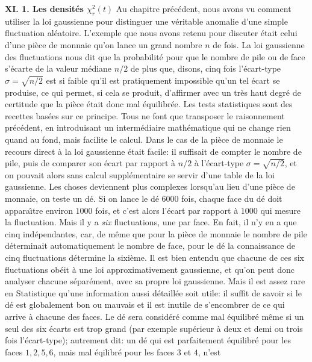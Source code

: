 {\bf XI. 1. Les densit\'es $\chi_r^2(t)$}  
\medskip
Au chapitre pr\'ec\'edent, nous avons vu comment utiliser la loi 
gaussienne pour distinguer une v\'eritable anomalie d'une simple
fluctuation al\'eatoire. L'exemple que nous avons retenu pour discuter
\'etait celui d'une pi\`ece de monnaie qu'on lance un grand nombre $n$ de
fois. La loi gaussienne des fluctuations nous dit que la probabilit\'e pour
que le nombre de pile ou de face s'\'ecarte de la valeur m\'ediane $n/2$ 
de plus que, disons, cinq fois l'\'ecart-type $\sigma = \sqrt{n/2}$ 
est si faible qu'il est pratiquement impossible qu'un tel \'ecart se
produise, ce qui permet, si cela se produit, d'affirmer avec un tr\`es 
haut degr\'e de certitude que la pi\`ece \'etait donc mal \'equilibr\'ee. 
\medskip
Les tests statistiques sont des recettes bas\'ees sur ce principe. Tous ne
font que transposer le raisonnement pr\'ec\'edent, en introduisant un
interm\'ediaire math\'ematique qui ne change rien quand au fond, mais
facilite le calcul. Dans le cas de la pi\`ece de monnaie le recours direct 
\`a la loi gaussienne \'etait facile: il suffisait de compter le nombre de 
pile, puis de comparer son \'ecart par rapport \`a $n/2$ \`a l'\'ecart-type 
$\sigma = \sqrt{n/2}$, et on pouvait alors sans calcul suppl\'ementaire 
se servir d'une table de la loi gaussienne.
\medskip
Les choses deviennent plus complexes lorsqu'au lieu d'une pi\`ece de
monnaie, on teste un d\'e. Si on lance le d\'e $6000$ fois, chaque face du 
d\'e doit appara{\^\i}tre environ $1000$ fois, et c'est alors l'\'ecart par
rapport \`a $1000$ qui mesure la fluctuation. Mais il y a {\it six}
fluctuations, une par face. En fait, il n'y en a que cinq ind\'ependantes, 
car, de m\^eme que pour la pi\`ece de monnaie le nombre de pile
d\'eterminait automatiquement le nombre de face, pour le d\'e la
connaissance de cinq fluctuations d\'etermine la sixi\`eme. Il est bien
entendu que chacune de ces six fluctuations ob\'eit \`a une loi
approximativement gaussienne, et qu'on peut donc analyser chacune
s\'epar\'ement, avec sa propre loi gaussienne. Mais il est assez rare en
Statistique qu'une information aussi d\'etaill\'ee soit utile: il suffit de
savoir si le d\'e est globalement bon ou mauvais et il est inutile de
s'encombrer de ce qui arrive \`a chacune des faces.  Le d\'e sera
consid\'er\'e comme mal \'equilibr\'e m\^eme si un seul des six \'ecarts
est trop grand (par exemple sup\'erieur \`a deux et demi ou trois fois
l'\'ecart-type); autrement dit: un d\'e qui est parfaitement \'equilibr\'e pour
les faces $1,2,5,6$, mais mal \'eqilibr\'e pour les faces $3$ et $4$, n'est 
